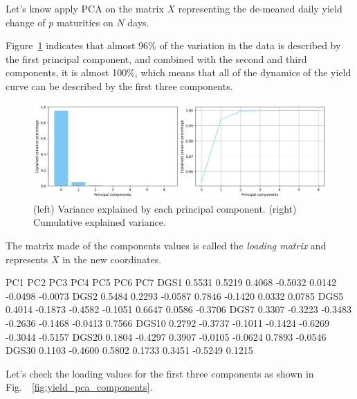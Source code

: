 Let's know apply PCA on the matrix $X$ representing the de-meaned daily yield change of $p$ maturities on $N$ days.


Figure~\ref{fig:pca_explained_variance} indicates that almost 96\% of the variation in the data is described by the first principal component, and combined with the second and third components, it is almost 100\%, which means that all of the dynamics of the yield curve can be described by the first three components.

\begin{figure}[hbtp]
	\centering
	\includegraphics[width=\linewidth]{figures/pca_explained_variance}
	\caption{(left) Variance explained by each principal component. (right) Cumulative explained variance.}
	\label{fig:pca_explained_variance}
\end{figure}

The matrix made of the components values is called the \emph{loading matrix} and represents $X$ in the new coordinates.

\begin{ioutput}
          PC1     PC2     PC3     PC4     PC5     PC6     PC7
DGS1   0.5531  0.5219  0.4068 -0.5032  0.0142 -0.0498 -0.0073
DGS2   0.5484  0.2293 -0.0587  0.7846 -0.1420  0.0332  0.0785
DGS5   0.4014 -0.1873 -0.4582 -0.1051  0.6647  0.0586 -0.3706
DGS7   0.3307 -0.3223 -0.3483 -0.2636 -0.1468 -0.0413  0.7566
DGS10  0.2792 -0.3737 -0.1011 -0.1424 -0.6269 -0.3044 -0.5157
DGS20  0.1804 -0.4297  0.3907 -0.0105 -0.0624  0.7893 -0.0546
DGS30  0.1103 -0.4600  0.5802  0.1733  0.3451 -0.5249  0.1215
\end{ioutput}

Let's check the loading values for the first three components as shown in Fig.~~\ref{fig:yield_pca_components}.
 
